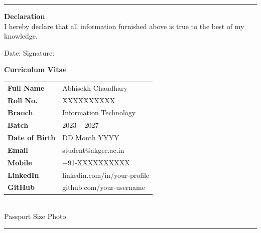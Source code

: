 \vspace{0.4cm}\hrule\vspace{0.4cm}

\noindent\textbf{Declaration}\\[3pt]
I hereby declare that all information furnished above is true to the best of
my knowledge.

\vspace{0.6cm}
\noindent Date: \submissiondate \hfill Signature: \underline{\hspace{4cm}}

\newpage
\thispagestyle{fancy}

\begin{center}
  {\Large\textbf{Curriculum Vitae}}
\end{center}

\vspace{0.3cm}

\noindent
\begin{minipage}[t]{0.72\textwidth}
  \begin{tabular}{@{}p{3.5cm}p{7cm}}
    \textbf{Full Name}      & Abhisekh Chaudhary \\[4pt]
    \textbf{Roll No.}       & XXXXXXXXXX \\[4pt]
    \textbf{Branch}         & Information Technology \\[4pt]
    \textbf{Batch}          & 2023 -- 2027 \\[4pt]
    \textbf{Date of Birth}  & DD Month YYYY \\[4pt]
    \textbf{Email}          & student@akgec.ac.in \\[4pt]
    \textbf{Mobile}         & +91-XXXXXXXXXX \\[4pt]
    \textbf{LinkedIn}       & linkedin.com/in/your-profile \\[4pt]
    \textbf{GitHub}         & github.com/your-username \\
  \end{tabular}
\end{minipage}
\hfill
\begin{minipage}[t]{0.24\textwidth}
  \centering
  \setlength{\fboxsep}{0pt}
  \fbox{\rule{3.5cm}{0pt}\rule{0pt}{4.5cm}}\\[2pt]
  {\small Passport Size Photo}
\end{minipage}

\vspace{0.5cm}\hrule\vspace{0.4cm}

